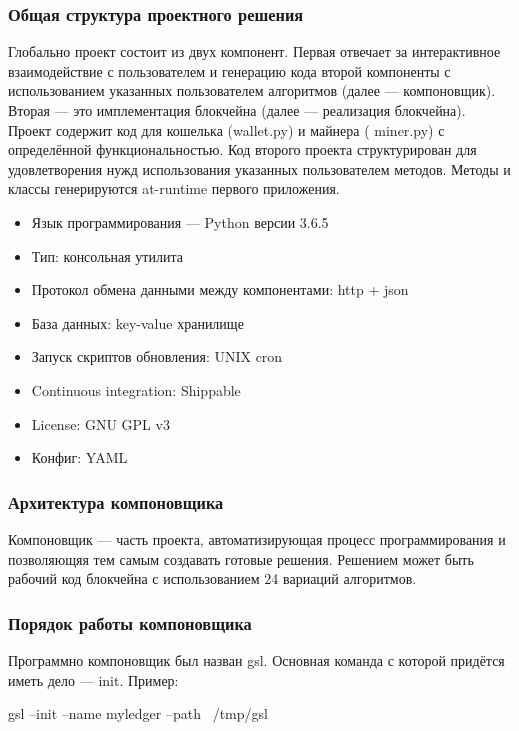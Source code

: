 \subsubsection{Общая структура проектного решения}
Глобально проект состоит из двух компонент. Первая отвечает за интерактивное
взаимодействие с пользователем и генерацию кода второй компоненты с
использованием указанных пользователем алгоритмов (далее --- компоновщик).
Вторая --- это имплементация блокчейна (далее --- реализация блокчейна).
Проект содержит код для кошелька ({\small wallet.py}) и майнера ({\small
miner.py}) с определённой функциональностью. Код второго проекта структурирован
для удовлетворения нужд использования указанных пользователем методов. Методы и
классы генерируются at-runtime первого приложения.

\begin{itemize}
    \item Язык программирования --- Python версии 3.6.5
    \item Тип: консольная утилита
    \item Протокол обмена данными между компонентами: http + json
    \item База данных: key-value хранилище
    \item Запуск скриптов обновления: UNIX cron
    \item Continuous integration: Shippable
    \item License: GNU GPL v3
    \item Конфиг: YAML
\end{itemize}

\subsubsection{Архитектура компоновщика}
Компоновщик --- часть проекта, автоматизирующая процесс программирования и
позволяющяя тем самым создавать готовые решения. Решением может быть рабочий
код блокчейна с использованием 24 вариаций алгоритмов.
\subsubsection{Порядок работы компоновщика}
Программно компоновщик был назван {\small gsl}. Основная команда с которой
придётся иметь дело --- init. Пример:\\

\begin{center}
    {\small gsl --init --name myledger --path ~/tmp/gsl}
\end{center}

